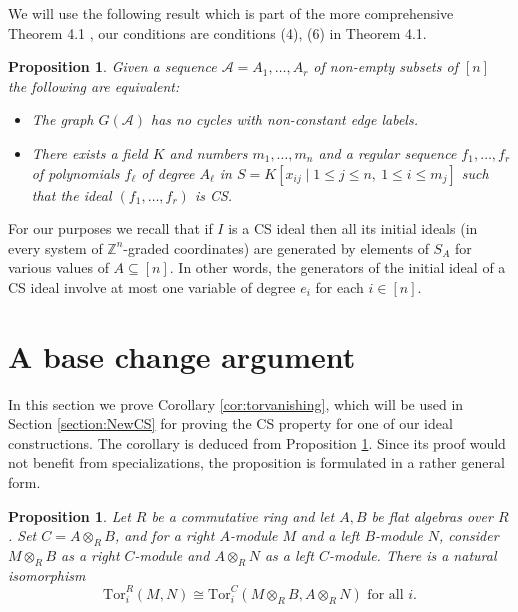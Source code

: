 \documentclass{amsart}
\newtheorem{proposition}[theorem]{Proposition}
\theoremstyle{definition}
\numberwithin{equation}{section}
\def\cA{\mathcal{A}}
\def\ZZ{\mathbb{Z}}
\begin{document}
We will use the following result which is part of the more comprehensive 
Theorem 4.1 \cite{Radical:support}, our conditions
 are conditions (4), (6)  in  Theorem 4.1.

\begin{proposition} \label{prop:456}
Given a sequence $\cA = A_1 , \ldots, A_r$ of non-empty subsets of $[n]$ 
the following are equivalent:
\begin{itemize}
\item[(1)] The graph $G(\cA)$ has no cycles with non-constant edge labels.
\item[(2)] There exists a field $K$ and numbers $m_1 , \ldots, m_n$ and a regular sequence $f_1 ,\ldots, f_r$ of polynomials $f_\ell$ of degree $A_\ell$ in $S=K[x_{ij}\mid 1\leq j\leq n,\ 1\leq i\leq m_j]$  such that the ideal $(f_1 ,\ldots , f_r)$ is CS.
\end{itemize}
\end{proposition}

For our purposes we recall that if $I$ is a CS ideal then all its initial ideals  (in every system  of $\ZZ^n$-graded coordinates) are  generated by elements of $S_A$ for various values of $A\subseteq [n]$. In other words, the generators of the initial ideal of a CS ideal involve at most one variable of degree $e_i$ for each $i\in [n]$.


\section{A base change argument}

In this section we prove Corollary \ref{cor:torvanishing}, which will
be used in Section \ref{section:NewCS} for proving the CS property for
one of our ideal constructions. The corollary is deduced from 
Proposition \ref{SriL}. Since its proof would not benefit from 
specializations, the proposition is formulated in a rather general form.


\begin{proposition} 
\label{SriL}
    Let $R$ be a commutative ring and let $A,B$ be flat algebras over $R$.
 Set $C=A\otimes_R B$, and for a right $A$-module $M$ and a left $B$-module $N$, consider $M\otimes_R B$ as a right $C$-module and $A\otimes_R N$ as a left $C$-module. There is a natural isomorphism
\[
\mathrm{Tor}^R_i(M,N) \cong \mathrm{Tor}^C_i(M\otimes_R B, A\otimes_R N) \text{ for all $i$.}
\]
\end{proposition}
\end{document}
